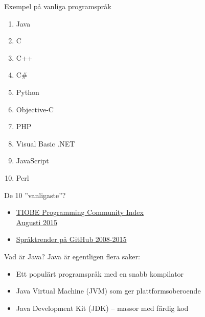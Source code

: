 \documentclass{lecturenotes}
\begin{document}
\begin{Slide}{Exempel på vanliga programspråk}
\begin{multicols}{2}
\begin{enumerate}
\item  Java
\item C
\item C++
\item C\#
\item Python
\item Objective-C
\item PHP
\item Visual Basic .NET
\item JavaScript
\item Perl
\end{enumerate}

\columnbreak %
De 10 ''vanligaste''?
\begin{itemize}
\item \href{http://www.tiobe.com/index.php/content/paperinfo/tpci/index.html}{TIOBE Programming Community Index \\ Augusti 2015}
\item \href{https://github.com/blog/2047-language-trends-on-github}{Språktrender på GitHub 2008-2015}
\end{itemize}
\end{multicols}
\end{Slide}

\begin{Slide}{Vad är Java?}
Java är egentligen flera saker:
\begin{itemize}
\item Ett populärt programspråk med en snabb kompilator
\item Java Virtual Machine (JVM) som ger plattformsoberoende
\item Java Development Kit (JDK) -- massor med färdig kod 
\end{itemize}
\end{Slide}

\end{document}
